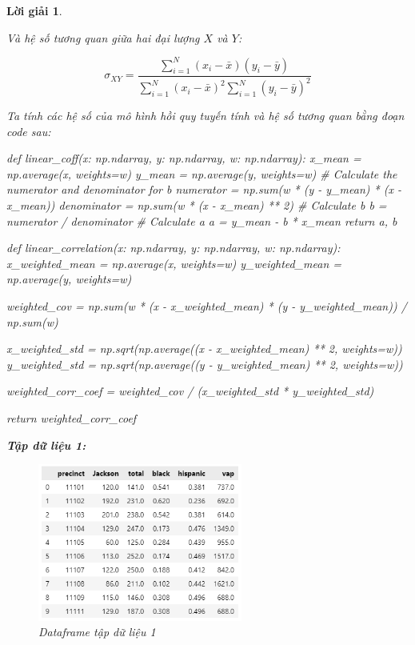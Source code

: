 \documentclass[14pt, a4paper]{article}
\theoremstyle{sltheorem}
\theoremstyle{soltheorem}
\newtheorem*{loigiai}{Lời giải}
\begin{document}
\begin{loigiai}
\begin{enumerate}
        Và hệ số tương quan giữa hai đại lượng $X$ và $Y$:

        \begin{equation*}
            \sigma_{XY} = \dfrac{\sum_{i=1}^N (x_i - \bar{x})(y_i - \bar{y})}{\sum_{i=1}^N (x_i - \bar{x})^2 \sum_{i=1}^N (y_i - \bar{y})^2}
        \end{equation*}

        Ta tính các hệ số của mô hình hồi quy tuyến tính và hệ số tương quan bằng đoạn code sau:

        \begin{python}
def linear_coff(x: np.ndarray, y: np.ndarray, w: np.ndarray):
    x_mean = np.average(x, weights=w)
    y_mean = np.average(y, weights=w)
    # Calculate the numerator and denominator for b
    numerator = np.sum(w * (y - y_mean) * (x - x_mean))
    denominator = np.sum(w * (x - x_mean) ** 2)
    # Calculate b
    b = numerator / denominator
    # Calculate a
    a = y_mean - b * x_mean
    return a, b
        \end{python}


\begin{python}
def linear_correlation(x: np.ndarray, y: np.ndarray, w: np.ndarray):
    x_weighted_mean = np.average(x, weights=w)
    y_weighted_mean = np.average(y, weights=w)
    
    weighted_cov = np.sum(w * (x - x_weighted_mean) * (y - y_weighted_mean)) / np.sum(w)
    
    x_weighted_std = np.sqrt(np.average((x - x_weighted_mean) ** 2, weights=w))
    y_weighted_std = np.sqrt(np.average((y - y_weighted_mean) ** 2, weights=w))
    
    weighted_corr_coef = weighted_cov / (x_weighted_std * y_weighted_std)
    
    return weighted_corr_coef
\end{python}

    \textbf{Tập dữ liệu 1:}

    \begin{figure}[H]
        \centering
        \includegraphics[width=0.6\textwidth]{figures/primary_df.png}
        \caption{Dataframe tập dữ liệu 1}
        \label{fig:primary_df}
    \end{figure}


\end{enumerate}
\end{loigiai}
\end{document}
